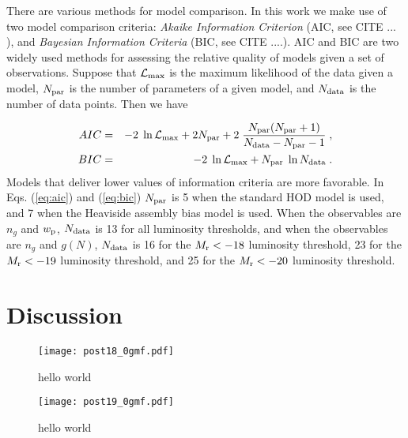\documentclass[12pt, preprint]{emulateapj}
\newcommand{\wpp}{w_{\rm p}}
\newcommand{\ngal}{n_{g}}
\newcommand{\gmf}{g(N)}
\newcommand{\mr}{M_{\rm r}}
\begin{document}
There are various methods for model comparison. In this work we make use of two model comparison criteria: \emph{Akaike Information Criterion} (AIC, see CITE ... ), and \emph{Bayesian Information Criteria} (BIC, see CITE ....). AIC and BIC are two widely used methods for assessing the relative quality of models given a set of observations.
Suppose that $\mathcal{L}_{\rm max}$ is the maximum likelihood of the data given a model, $N_{\rm par}$ is the number of parameters of a given model, and $N_{\rm data}$ is the number of data points. Then we have

\begin{eqnarray}
AIC&=& -2\;\ln \mathcal{L}_{\rm max} + 2N_{\rm par} + 2\;\frac{N_{\rm par}(N_{\rm par}+1)}{N_{\rm data}-N_{\rm par}-1} \; , \label{eq:aic}\\
BIC&=& -2\;\ln \mathcal{L}_{\rm max} + N_{\rm par}\;\ln N_{\rm data} \; . \label{eq:bic}
\end{eqnarray}
Models that deliver lower values of information criteria are more favorable. In Eqs. (\ref{eq:aic}) and (\ref{eq:bic}) $N_{\rm par}$ is 5 when the standard HOD model is used, and 7 when the Heaviside assembly bias model is used. When the observables are $\ngal$ and $\wpp$, $N_{\rm data}$ is 13 for all luminosity thresholds, and when the observables are $\ngal$ and $\gmf$, $N_{\rm data}$ is 16 for the $\mr < -18$ luminosity threshold, 23 for the $\mr < -19$ luminosity threshold, and 25 for the $\mr < -20$ luminosity threshold. 




\section{Discussion}




\begin{figure*}
\begin{center}
\texttt{[image: post18\_0gmf.pdf]}
\caption{hello world}
\label{fig:abc_converge}
\end{center}
\end{figure*}

\begin{figure*}
\begin{center}
\texttt{[image: post19\_0gmf.pdf]}
\caption{hello world}
\label{fig:abc_converge}
\end{center}
\end{figure*}
\end{document}
